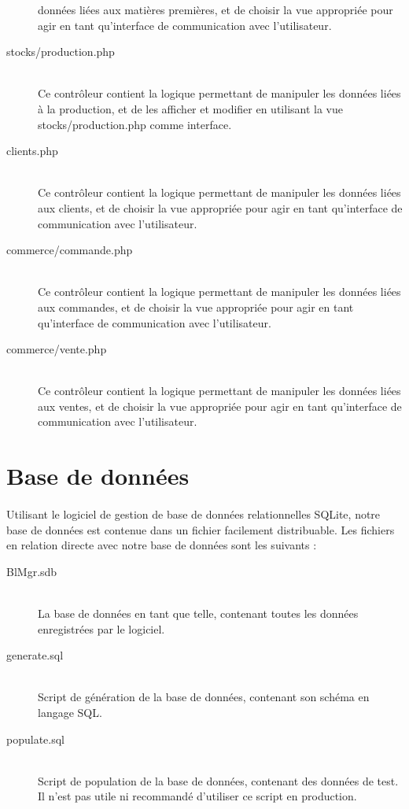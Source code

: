\begin{description}
                données liées aux matières premières, et de choisir la vue
                appropriée pour agir en tant qu'interface de communication
                avec l'utilisateur.
            \item[stocks/production.php]\hfill \\
                Ce contrôleur contient la logique permettant de manipuler les
                données liées à la production, et de les afficher et modifier
                en utilisant la vue stocks/production.php comme interface.
            \item[clients.php]\hfill \\
                Ce contrôleur contient la logique permettant de manipuler les
                données liées aux clients, et de choisir la vue appropriée
                pour agir en tant qu'interface de communication avec
                l'utilisateur.
            \item[commerce/commande.php]\hfill \\
                Ce contrôleur contient la logique permettant de manipuler les
                données liées aux commandes, et de choisir la vue appropriée
                pour agir en tant qu'interface de communication avec
                l'utilisateur.
            \item[commerce/vente.php]\hfill \\
                Ce contrôleur contient la logique permettant de manipuler les
                données liées aux ventes, et de choisir la vue appropriée pour
                agir en tant qu'interface de communication avec l'utilisateur.
        \end{description}

\section{Base de données}
    \paragraph{}
        Utilisant le logiciel de gestion de base de données relationnelles
        SQLite, notre base de données est contenue dans un fichier facilement
        distribuable.
        Les fichiers en relation directe avec notre base de données sont les
        suivants :
        \begin{description}
            \item[BlMgr.sdb]\hfill \\
                La base de données en tant que telle, contenant toutes les
                données enregistrées par le logiciel.
            \item[generate.sql]\hfill \\
                Script de génération de la base de données, contenant son
                schéma en langage SQL.
            \item[populate.sql]\hfill \\
                Script de population de la base de données, contenant des
                données de test.
                Il n'est pas utile ni recommandé d'utiliser ce script en
                production.
        \end{description}
